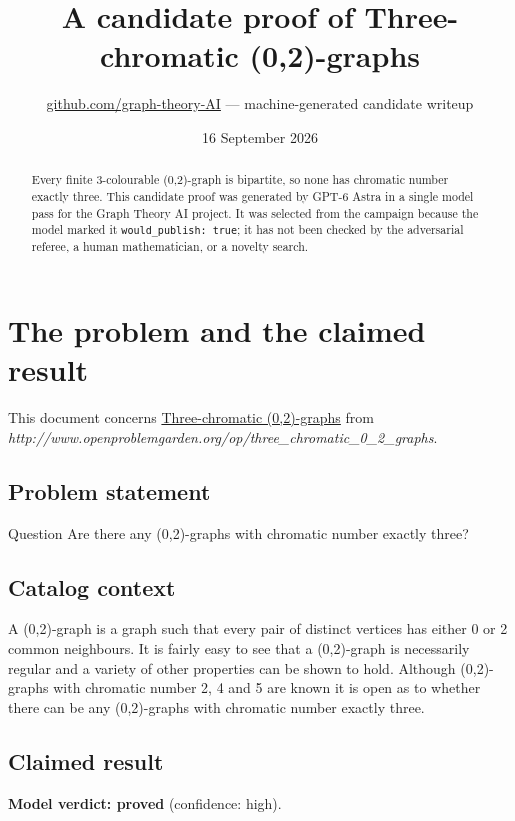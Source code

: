 \documentclass[
  11pt,
  a4paper,
]{article}
\title{A candidate proof of Three-chromatic (0,2)-graphs}
\author{\href{https://github.com/graph-theory-AI}{github.com/graph-theory-AI}
--- machine-generated candidate writeup}
\date{16 September 2026}
\newcounter{none} %
\begin{document}
\maketitle
\begin{abstract}
Every finite 3-colourable (0,2)-graph is bipartite, so none has
chromatic number exactly three. This candidate proof was generated by
GPT-6 Astra in a single model pass for the Graph Theory AI project. It
was selected from the campaign because the model marked it
\texttt{would\_publish:\ true}; it has not been checked by the
adversarial referee, a human mathematician, or a novelty search.
\end{abstract}

\section{The problem and the claimed
result}\label{the-problem-and-the-claimed-result}

This document concerns
\href{https://graph-theory-ai.github.io/graph-conjectures/op/three_chromatic_0_2_graphs/}{Three-chromatic
(0,2)-graphs} from
\emph{http://www.openproblemgarden.org/op/three\_chromatic\_0\_2\_graphs}.

\subsection{Problem statement}\label{problem-statement}

Question Are there any (0,2)-graphs with chromatic number exactly three?

\subsection{Catalog context}\label{catalog-context}

A (0,2)-graph is a graph such that every pair of distinct vertices has
either 0 or 2 common neighbours. It is fairly easy to see that a
(0,2)-graph is necessarily regular and a variety of other properties can
be shown to hold. Although (0,2)-graphs with chromatic number 2, 4 and 5
are known it is open as to whether there can be any (0,2)-graphs with
chromatic number exactly three.

\subsection{Claimed result}\label{claimed-result}

\textbf{Model verdict: proved} (confidence: high).
\end{document}
